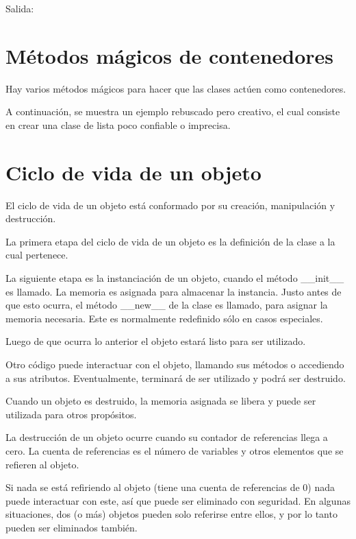 \documentclass{report}
\newcommand{\out}[1]{
  Salida:
  \outfile{#1}
}
\begin{document}
\out{codigo/20-objetos/gt.out}

\section{Métodos mágicos de contenedores}

Hay varios métodos mágicos para hacer que las clases actúen como contenedores.


A continuación, se muestra un ejemplo rebuscado pero creativo, el cual consiste en crear una clase de lista poco confiable o imprecisa.



\section{Ciclo de vida de un objeto}

El ciclo de vida de un objeto está conformado por su creación, manipulación y destrucción.\smallskip

La primera etapa del ciclo de vida de un objeto es la definición de la clase a la cual pertenece.\smallskip

La siguiente etapa es la instanciación de un objeto, cuando el método \_\_init\_\_ es llamado. La memoria es asignada para almacenar la instancia. Justo antes de que esto ocurra, el método \_\_new\_\_ de la clase es llamado, para asignar la memoria necesaria. Este es normalmente redefinido sólo en casos especiales.\smallskip

Luego de que ocurra lo anterior el objeto estará listo para ser utilizado.\smallskip

Otro código puede interactuar con el objeto, llamando sus métodos o accediendo a sus atributos. Eventualmente, terminará de ser utilizado y podrá ser destruido.\smallskip

Cuando un objeto es destruido, la memoria asignada se libera y puede ser utilizada para otros propósitos.\smallskip

La destrucción de un objeto ocurre cuando su contador de referencias llega a cero. La cuenta de referencias es el número de variables y otros elementos que se refieren al objeto.\smallskip

Si nada se está refiriendo al objeto (tiene una cuenta de referencias de 0) nada puede interactuar con este, así que puede ser eliminado con seguridad.
En algunas situaciones, dos (o más) objetos pueden solo referirse entre ellos, y por lo tanto pueden ser eliminados también.\smallskip
\end{document}
